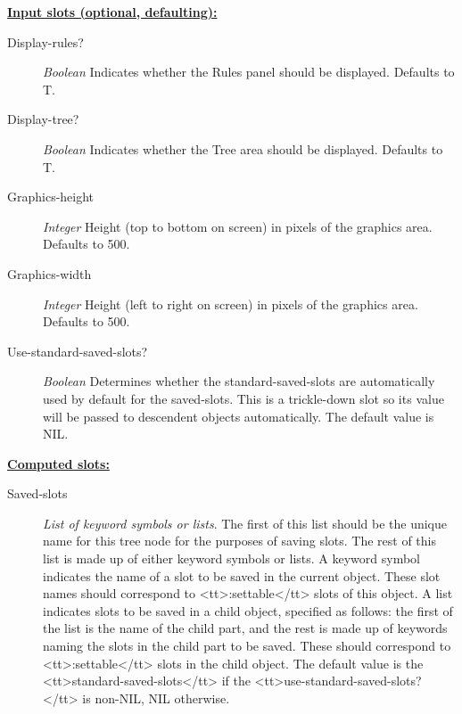 \documentclass [11pt]{book}
\begin{document}
\begin{itemize}
\textbf{
\underline{Input slots (optional, defaulting):}}

\begin{description}

\item [Display-rules?]
\emph{Boolean} Indicates whether the Rules panel should be displayed. Defaults to T.


\item [Display-tree?]
\emph{Boolean} Indicates whether the Tree area should be displayed. Defaults to T.


\item [Graphics-height]
\emph{Integer} Height (top to bottom on screen) in pixels of the graphics area. Defaults to 500.


\item [Graphics-width]
\emph{Integer} Height (left to right on screen) in pixels of the graphics area. Defaults to 500.


\item [Use-standard-saved-slots?]
\emph{Boolean} Determines whether the standard-saved-slots are automatically used by default for the
saved-slots. This is a trickle-down slot so its value will be passed to descendent objects automatically.
The default value is NIL.


\end{description}






\textbf{
\underline{Computed slots:}}

\begin{description}

\item [Saved-slots]
\emph{List of keyword symbols or lists}.
The first of this list should be the unique name for this tree node for the purposes of saving slots.
The rest of this list is made up of either keyword symbols or lists. A keyword symbol indicates the
name of a slot to be saved in the current object. These slot names should correspond to <tt>:settable</tt>
slots of this object. A list indicates slots to be saved in a child object, specified as
follows: the first of the list is the name of the child part, and the rest is made up of keywords naming
the slots in the child part to be saved. These should correspond to <tt>:settable</tt>
slots in the child object.
The default value is the <tt>standard-saved-slots</tt> if the <tt>use-standard-saved-slots?</tt> is non-NIL, NIL otherwise.



\end{description}
\end{itemize}
\end{document}
